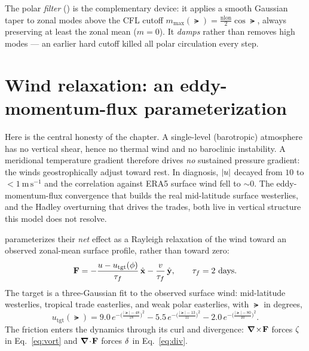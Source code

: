 
The polar \emph{filter} ()
is the complementary device: it applies a smooth Gaussian taper to zonal modes
above the CFL cutoff $m_{\max}(\lat)=\tfrac{\mathrm{nlon}}{2}\cos\lat$, always
preserving at least the zonal mean ($m=0$). It \emph{damps} rather than removes
high modes --- an earlier hard cutoff killed all polar circulation every step.

\section{Wind relaxation: an eddy-momentum-flux parameterization}
\label{sec:windrelax}

Here is the central honesty of the chapter. A single-level (barotropic) atmosphere
has no vertical shear, hence no thermal wind and no baroclinic instability. A
meridional temperature gradient therefore drives \emph{no} sustained pressure
gradient: the winds geostrophically adjust toward rest. In diagnosis,
$|u|$ decayed from $10$ to $<1\ \mathrm{m\,s^{-1}}$ and the correlation against
ERA5 surface wind \citep{hersbach2020era5} fell to $\sim 0$. The eddy-momentum-flux convergence that builds
the real mid-latitude surface westerlies, and the Hadley overturning that drives
the trades, both live in vertical structure this model does not resolve.

\model{} parameterizes their \emph{net} effect as a Rayleigh relaxation of the wind
toward an observed zonal-mean surface profile, rather than toward zero:
\begin{equation}
  \mathbf{F} = -\frac{u - u_{\mathrm{tgt}}(\phi)}{\tau_f}\,\hat{\mathbf{x}}
               -\frac{v}{\tau_f}\,\hat{\mathbf{y}},
  \qquad \tau_f = 2\ \text{days}.
  \label{eq:drag}
\end{equation}
The target is a three-Gaussian fit to the observed surface wind: mid-latitude
westerlies, tropical trade easterlies, and weak polar easterlies, with $\lat$ in
degrees,
\begin{equation}
  u_{\mathrm{tgt}}(\lat) =
     9.0\,e^{-\big(\frac{|\lat|-48}{18}\big)^2}
   - 5.5\,e^{-\big(\frac{|\lat|-13}{11}\big)^2}
   - 2.0\,e^{-\big(\frac{|\lat|-80}{10}\big)^2}.
  \label{eq:utarget}
\end{equation}
The friction enters the dynamics through its curl and divergence: $\boldsymbol{\nabla}\!\times\!\mathbf{F}$
forces $\zeta$ in Eq.~\eqref{eq:vort} and $\boldsymbol{\nabla}\!\cdot\!\mathbf{F}$ forces $\delta$ in
Eq.~\eqref{eq:div}.

